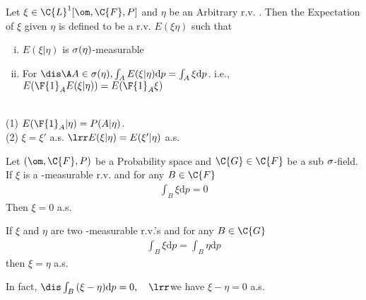 \newpage
{}

\begin{definition}
    Let $\xi \in \C{L}^1[\om, \C{F}, P]$ and $\eta$ be an Arbitrary r.v. . Then the Expectation 
    of $\xi$ given $\eta$ is defined to be a r.v. $E(\xi\eta)$ such that
    \begin{enumerate}[(i)]
        \item $E(\xi|\eta)$ is $\sigma(\eta)$-measurable
        \item For $\dis \A A \in \sg(\eta), \int_{A}^{}{E(\xi|\eta) \mathrm{d}}p = \int_{A}^{}{\xi \mathrm{d}p}$.
        i.e., $E(\F{1}_AE(\xi|\eta)) = E(\F{1}_A\xi)$
    \end{enumerate}

    \remark \\
    (1) $E(\F{1}_A|\eta) = P(A|\eta)$.\\
    (2) $\xi=\xi'$ a.s. $\lrr E(\xi|\eta) = E(\xi'|\eta)$ a.s.
\end{definition}

\begin{lemma}
    Let $(\om, \C{F}, P)$ be a Probability space and $\C{G} \in \C{F}$ be a sub $\sigma$-field.
    If $\xi$ is a -measurable r.v. and for any $B \in \C{F}$
    \begin{align*}
        \int_{B}^{}{\xi \mathrm{d}p} = 0
    \end{align*}  
    Then $\xi = 0$ a.s. 
\end{lemma}

\remark If $\xi$ and $\eta$ are two -measurable r.v.'s and for any $B\in \C{G}$
\begin{align*}
    \int_{B}^{}{\xi \mathrm{d}p} = \int_{B}^{}{\eta \mathrm{d}p}
\end{align*}
then $\xi = \eta$ a.s.

 In fact, $\dis \int_{B}^{}{(\xi-\eta)}{ \mathrm{d}p} = 0,\quad \lrr$\quad we have $\xi - \eta = 0$ a.s.


